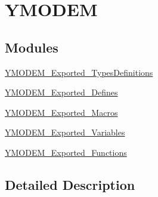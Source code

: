 \hypertarget{group___y_m_o_d_e_m}{}\section{Y\+M\+O\+D\+EM}
\label{group___y_m_o_d_e_m}
\subsection*{Modules}
\begin{DoxyCompactItemize}
\item 
\mbox{\hyperlink{group___y_m_o_d_e_m___exported___types_definitions}{Y\+M\+O\+D\+E\+M\+\_\+\+Exported\+\_\+\+Types\+Definitions}}
\item 
\mbox{\hyperlink{group___y_m_o_d_e_m___exported___defines}{Y\+M\+O\+D\+E\+M\+\_\+\+Exported\+\_\+\+Defines}}
\item 
\mbox{\hyperlink{group___y_m_o_d_e_m___exported___macros}{Y\+M\+O\+D\+E\+M\+\_\+\+Exported\+\_\+\+Macros}}
\item 
\mbox{\hyperlink{group___y_m_o_d_e_m___exported___variables}{Y\+M\+O\+D\+E\+M\+\_\+\+Exported\+\_\+\+Variables}}
\item 
\mbox{\hyperlink{group___y_m_o_d_e_m___exported___functions}{Y\+M\+O\+D\+E\+M\+\_\+\+Exported\+\_\+\+Functions}}
\end{DoxyCompactItemize}


\subsection{Detailed Description}
